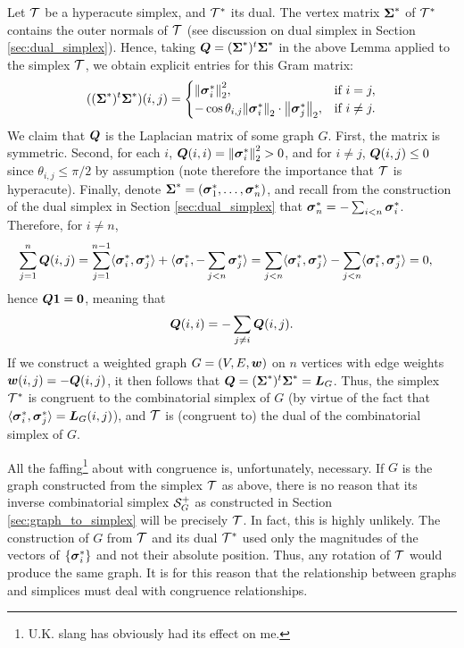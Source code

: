 Let $\mathcal{T}$ be a hyperacute simplex, and $\mathcal{T}^*$ its dual. The vertex matrix $\boldsymbol{\Sigma}^*$ of $\mathcal{T}^*$ contains the outer normals of $\mathcal{T}$ (see discussion on dual simplex in Section \ref{sec:dual_simplex}). Hence, taking $\vb*{Q}=(\boldsymbol{\Sigma}^*)^t \boldsymbol{\Sigma}^*$ in the above Lemma applied to the simplex $\mathcal{T}$, we obtain explicit entries for this Gram matrix:  
\begin{equation*}
    ((\boldsymbol{\Sigma}^*)^t \boldsymbol{\Sigma}^*)(i,j) = \begin{cases}
    \norm{\vb*{\sigma}_i^*}_2^{2},& \text{if }i=j,\\
-\cos\theta_{i,j} \norm{\vb*{\sigma}_i^*}_2\cdot \norm{\vb*{\sigma}_j^*}_2,& \text{if }i\neq j.
    \end{cases}
\end{equation*}
We claim that $\vb*{Q}$ is the Laplacian matrix of some graph $G$. First, the matrix is symmetric. Second,
for each $i$, $\vb*{Q}(i,i)=\norm{\vb*{\sigma}_i^*}_2^{2}>0$, and for $i\neq j$, $\vb*{Q}(i,j) \leq 0$ since $\theta_{i,j}\leq \pi/2$ by assumption (note therefore the importance that $\mathcal{T}$ is hyperacute). Finally, denote $\boldsymbol{\Sigma}^*=(\vb*{\sigma}_1^*,\dots,\vb*{\sigma}^*_n)$, and recall from the construction of the dual simplex in Section \ref{sec:dual_simplex} that $\vb*{\sigma}_n^*=-\sum_{i<n}\vb*{\sigma}^*_i$. Therefore, for $i\neq n$, 
\begin{align*}
    \sum_{j=1}^n \vb*{Q}(i,j) &= \sum_{j=1}^{n-1} \langle \vb*{\sigma}^*_i,\vb*{\sigma}^*_j\rangle + \langle \vb*{\sigma}^*_i,-\sum_{j<n}\vb*{\sigma}_j^*\rangle = \sum_{j<n}\langle \vb*{\sigma}^*_i,\vb*{\sigma}^*_j\rangle - \sum_{j<n}\langle \vb*{\sigma}^*_i,\vb*{\sigma}^*_j\rangle  = 0,
\end{align*}
hence $\vb*{Q}\vb{1}=\vb{0}$, meaning that 
\[\vb*{Q}(i,i) = -\sum_{j\neq i}\vb*{Q}(i,j).\]
If we construct a weighted graph $G=(V,E,\vb*{w})$ on $n$ vertices with edge weights $\vb*{w}(i,j) = -\vb*{Q}(i,j)$, it then follows that $\vb*{Q}=(\boldsymbol{\Sigma}^*)^t\boldsymbol{\Sigma}^*=\vb*{L}_G$. Thus, the simplex $\mathcal{T}^*$ is congruent to the combinatorial simplex of $G$ (by virtue of the fact  that $\langle \vb*{\sigma}_i^*,\vb*{\sigma}_j^*\rangle = \vb*{L}_G(i,j)$), and $\mathcal{T}$ is (congruent to) the dual of the combinatorial simplex of $G$. 

\begin{remark}
	All the faffing\footnote{U.K. slang has obviously had its effect on me.} about with congruence is, unfortunately, necessary. If $G$ is the graph constructed from the simplex $\mathcal{T}$ as above, there is no reason that its inverse combinatorial simplex $\mathcal{S}^+_G$ as constructed in Section \ref{sec:graph_to_simplex} will be precisely $\mathcal{T}$. In fact, this is highly unlikely. The construction of $G$ from $\mathcal{T}$ and its dual $\mathcal{T}^*$ used only the magnitudes of the vectors of $\{\vb*{\sigma}_i^*\}$ and not their absolute position. Thus, any rotation of $\mathcal{T}$ would produce the same graph. It is for this reason that the relationship between graphs and simplices must deal with congruence  relationships. 
\end{remark}


